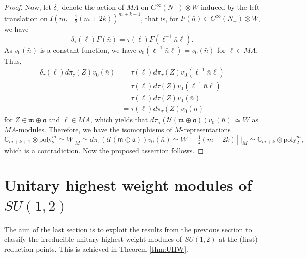 \documentclass[reqno,11pt]{amsart}
\theoremstyle{remark}
\numberwithin{equation}{section}
\newcommand{\fa}{{\mathfrak a}}
\newcommand{\fm}{{\mathfrak m}}
\newcommand{\C}{\mathbb{C}}
\newcommand{\Cal}{\mathcal}
\newcommand{\poly}{\mathrm{poly}}
\begin{document}
\begin{proof}
Now, let $\delta_\tau$ denote the action of $MA$
on $C^\infty(N_-)\otimes W$ induced by the left translation 
on $I(m, -\tfrac{1}{2}(m+2k))^{m+k+1}$, that is,  
for $F(\bar{n}) \in C^\infty(N_-)\otimes W$, we have
\begin{equation*}
\delta_\tau(\ell)F(\bar{n})=\tau(\ell)F(\ell^{-1}\bar{n}\ell).
\end{equation*}
As $v_0(\bar{n})$ is a constant function, 
we have $v_0(\ell^{-1} \bar{n}\ell) = v_0(\bar{n})$ for $\ell \in MA$.
Thus,
\begin{align*}
\delta_\tau(\ell)d\pi_\tau(Z)v_0(\bar{n})
&=\tau(\ell)d\pi_\tau(Z)v_0(\ell^{-1}\bar{n}\ell)\\
&=\tau(\ell)d\tau(Z)v_0(\ell^{-1}\bar{n}\ell)\\
&=\tau(\ell)d\tau(Z)v_0(\bar{n})\\
&=\tau(\ell)d\pi_\tau(Z)v_0(\bar{n})
\end{align*}
for $Z \in \fm\oplus \fa$ and $\ell \in MA$,
which yields that
$d\pi_\tau(\Cal{U}(\fm\oplus \fa))v_0(\bar{n})\ \simeq W$ as $MA$-modules.
Therefore, we have the isomorphisms of $M$-representations
\begin{equation*}
\C_{m+k+1}\otimes \poly_2^m \simeq 
W\vert_M\simeq d\pi_\tau(\Cal{U}(\fm\oplus \fa))v_0(\bar{n})
\simeq W[-\tfrac{1}{2}(m+2k)]\vert_M
\simeq \C_{m+k}\otimes \poly_2^m,
\end{equation*}
which is a contradiction. Now the proposed assertion follows.
\end{proof}



\section{Unitary highest weight modules of $SU(1,2)$}\label{sec:SU}


The aim of the last section is to exploit the results from the previous section to classify 
the irreducible unitary highest weight modules of $SU(1,2)$ at the (first) reduction 
points. This is achieved in Theorem \ref{thm:UHW}.


\end{document}
